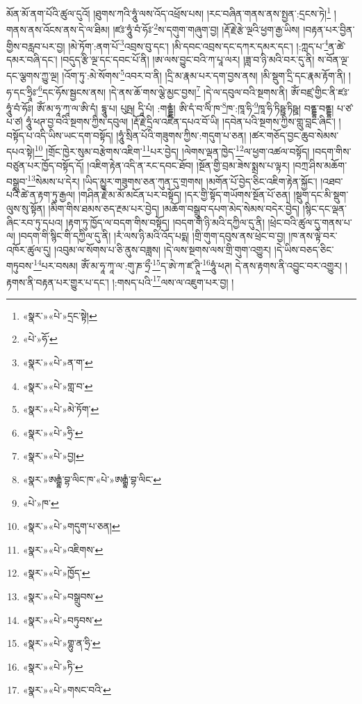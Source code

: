 མོན་མོ་ནག་པོའི་ཚུལ་དུའོ། །ཐུགས་ཀའི་ཧཱུཾ་ལས་འོད་འཕྲོས་པས། །རང་བཞིན་གནས་ནས་སྤྱན་:དྲངས་ཏེ།\footnote{«སྣར་»«པེ་»དྲང་སྟེ།} །གནས་ནས་འོངས་ནས་དེ་ལ་ཐིམ། །ཛཿ་ཧཱུཾ་བཾ་ཧོཿ་\footnote{«པེ་»ཧོ་}ས་དགུག་གཞུག་བྱ། །རྡོ་རྗེ་རྩེ་ལྔའི་ཕྱག་རྒྱ་ཡིས། །བརྟན་པར་བྱིན་གྱིས་བརླབ་པར་བྱ། །མེ་ཏོག་:ནག་པོ་\footnote{«སྣར་»«པེ་»ན་ག་}འབྲས་བུ་དང་། །མི་དབང་འབྲས་དང་དཀར་དམར་དང་། །:ཀླད་པ་\footnote{«སྣར་»«པེ་»གླ་བ་}ན་ཚེ་དམར་བཞི་དང་། །བདུད་རྩི་ལྔ་དང་དབང་པོ་ནི། །ཨ་ལས་བྱུང་བའི་ཀ་པཱ་ལར། །ཟླ་བ་ཉི་མའི་བར་དུ་ནི། ས་བོན་ལྔ་དང་ལྕགས་ཀྱུ་ལྔ། །འོག་ཏུ་:མེ་སོགས་\footnote{«སྣར་»«པེ་»མེ་ཏོག་}འབར་བ་ནི། །དྲི་མ་རྣམ་པར་དག་བྱས་ནས། །མི་སྡུག་དྲི་དང་རྣམ་རྟོག་ནི། །ཧ་དང་ཧྲཱིཿ་\footnote{«སྣར་»«པེ་»ཧྲི་}དང་ཧོས་སྦྱངས་ནས། །དེ་ནས་ཆོ་གས་ལྕེ་མྱང་བྱས།\footnote{«སྣར་»«པེ་»བྱ།} །དེ་ལ་དབུལ་བའི་སྔགས་ནི། ཨོཾ་བཛྲ་གྱིང་ནི་ཛཿ་ཧཱུཾ་བཾ་ཧོཿ། ཨོཾ་མ་ཧཱ་ཀཱ་ལ་ཨི་དཾ། དྷཱུ་པ། པུཥྤ། དཱི་པཾ། :གནྡྷཾ། ཨི་དཾ་བ་ལིཾ་ཁ་\footnote{«སྣར་»ཨརྒྷཾ་བྷ་ལིང་ཁ་«པེ་»ཨརྒྷཾ་བྷ་ལིང་}ཁ་:ཁཱ་ཧི་\footnote{«པེ་»ཁ་}ཁཱ་ཧི་ཏིཥྛ་ཏིཥྛ། བནྡྷ་བནྡྷ། པ་ཙ་པ་ཙ། ཧཱུཾ་ཕཊ་བྱ་བའི་སྔགས་ཀྱིས་དབུལ། །རྡོ་རྗེ་དྲིལ་འཛིན་དཔའ་བོ་ཡི། །དབེན་པའི་སྔགས་ཀྱིས་གླུ་བླང་ཞིང་། །བསྟོད་པ་འདི་ཡིས་ཡང་དག་བསྟོད། །ཧཱུཾ་སྲིན་པོའི་གཟུགས་ཀྱིས་:གདུག་པ་ཅན། །ཚར་གཅོད་བྱང་ཆུབ་སེམས་དཔའ་སྟེ།\footnote{«སྣར་»«པེ་»གདུག་པ་ཅན།} །གྲོང་ཁྱེར་སུམ་བརྩེགས་འཇིག་\footnote{«སྣར་»«པེ་»འཇིགས་}པར་བྱེད། །ལེགས་ལྡན་ཁྱེད་\footnote{«སྣར་»«པེ་»ཁྱོད་}ལ་ཕྱག་འཚལ་བསྟོད། །བདག་གིས་བཙུན་པར་ཁྱོད་བསྟོད་དོ། །འཇིག་རྟེན་འདི་ན་རང་དབང་ཐོབ། །སྔོན་གྱི་བྲམ་ཟེས་སྨྲས་པ་ལྟར། །བཀྲ་ཤིས་མཆོག་བསྒྲུབ་\footnote{«སྣར་»«པེ་»བསྒྲུབས་}སེམས་པ་དེར། །ཡིད་མྱུར་གཟུགས་ཅན་ཀུན་དུ་གྲགས། །མགོན་པོ་བྱེད་ཅིང་འཇིག་རྟེན་སྐྱོང་། །འཐབ་པའི་ཚེ་ན་རྟག་ཏུ་རྒྱལ། །གཤིན་རྗེ་མ་མོ་མངོན་པར་བསྟོད། །དར་གྱི་སྟོད་གཡོགས་སྔོན་པོ་ཅན། །སྡུག་དང་མི་སྡུག་ལུས་སུ་སྟོན། །མིག་གིས་ཐམས་ཅད་རྔམ་པར་བྱེད། །མཆོག་བསྒྲུབ་དཔག་མེད་སེམས་བདེར་བྱེད། །སྙིང་དང་ལྡན་ཞིང་རབ་ཏུ་དཔའ། །རྟག་ཏུ་ཁྱོད་ལ་བདག་གིས་བསྟོད། །བདག་གི་ཉི་མའི་དཀྱིལ་དུ་ནི། །ཕྲེང་བའི་ཚུལ་དུ་གནས་པ་ལ། །བདག་གི་སྙིང་གི་དཀྱིལ་དུ་ནི། །རཾ་ལས་ཉི་མའི་འོད་པདྨ། །གྲི་གུག་དབུས་ནས་ཕྲེང་བ་བྱ། །ཁ་ནས་ལྟེ་བར་འཁོར་ཚུལ་དུ། །འབུམ་ལ་སོགས་པ་ཅི་ནུས་བཟླས། །དེ་ལས་སྔགས་ལས་གྲི་གུག་འགྱུར། །དེ་ཡིས་བཅད་ཅིང་གཏུབས་\footnote{«སྣར་»«པེ་»བཏུབས་}པར་བསམ། ཨོཾ་མ་ཧཱ་ཀཱ་ལ་:གུ་ཎ་ཧྲྀ་\footnote{«སྣར་»«པེ་»གྷུ་ན་ཧྲི་}ད་ཨེ་ཀ་ཛ་ཊཱི་\footnote{«སྣར་»«པེ་»ཏི་}ཧཱུཾ་ཕཊ། དེ་ནས་རྟགས་ནི་འབྱུང་བར་འགྱུར། །རྟགས་ནི་བརྟན་པར་གྱུར་པ་དང་། །:གསད་པའི་\footnote{«སྣར་»«པེ་»གསང་བའི་}ལས་ལ་འཇུག་པར་བྱ། །
